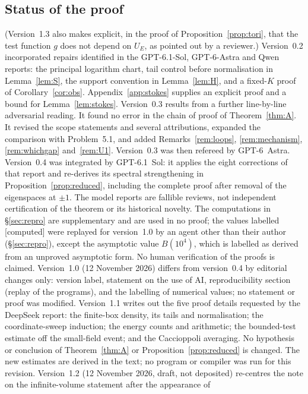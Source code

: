 \documentclass[11pt,a4paper]{article}
\theoremstyle{plain}
\theoremstyle{definition}
\theoremstyle{remark}
\numberwithin{equation}{section}
\newcommand{\st}[1]{\textsf{[#1]}}
\begin{document}
\subsection{Status of the proof}\label{sec:status}
(Version~1.3 also makes explicit, in the proof of Proposition~\ref{prop:tori}, that the test function $g$ does not depend on $U_E$, as pointed out by a reviewer.)
Version~0.2 incorporated repairs identified in the GPT-6.1-Sol, GPT-6-Astra and Qwen reports: the principal logarithm chart,
tail control before normalisation in Lemma~\ref{lem:S}, the support convention in Lemma~\ref{lem:H}, and a fixed-$K$ proof of
Corollary~\ref{cor:obs}. Appendix~\ref{app:stokes} supplies an explicit proof and a bound for Lemma~\ref{lem:stokes}.
Version~0.3 results from a further line-by-line adversarial reading. It found no error in the chain of proof of Theorem~\ref{thm:A}.
It revised the scope statements and several attributions, expanded the comparison with Problem~5.1, and added
Remarks~\ref{rem:loops}, \ref{rem:mechanism}, \ref{rem:whichgap} and~\ref{rem:U1}.
Version~0.3 was then refereed by GPT-6~Astra. Version~0.4 was integrated by GPT-6.1~Sol: it applies the eight corrections of that report
and re-derives its spectral strengthening in Proposition~\ref{prop:reduced}, including the complete proof after removal of the
eigenspaces at $\pm1$.
The model reports are fallible reviews, not independent certification of the theorem or its historical novelty.
The computations in \S\ref{sec:repro} are supplementary and are used in no proof; the values labelled \st{computed} were replayed for version~1.0 by an
agent other than their author (\S\ref{sec:repro}), except the asymptotic value $B(10^4)$, which is labelled as derived from an unproved asymptotic form.
No human verification of the proofs is claimed.
Version~1.0 (12 November 2026) differs from version~0.4 by editorial changes only: version label, statement on the use of AI,
reproducibility section (replay of the programs), and the labelling of numerical values; no statement or proof was modified.
Version~1.1 writes out the five proof details requested by the DeepSeek report: the finite-box density, its tails and normalisation;
the coordinate-sweep induction; the energy counts and arithmetic; the bounded-test estimate off the small-field event; and the
Caccioppoli averaging. No hypothesis or conclusion of Theorem~\ref{thm:A} or Proposition~\ref{prop:reduced} is changed.
The new estimates are derived in the text; no program or compiler was run for this revision.
Version~1.2 (12 November 2026, draft, not deposited) re-centres the note on the infinite-volume statement after the appearance of
\end{document}
